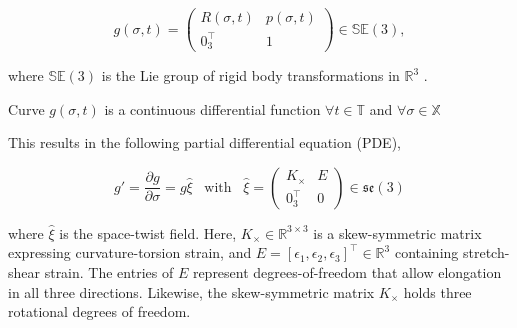\begin{equation}
    g(\sigma,t) = \begin{pmatrix}  R(\sigma,t) & p(\sigma,t) \\ 0_3^\top & 1 \end{pmatrix} \in \mathbb{SE}(3),
    \label{eq2:g}
\end{equation}

where $\mathbb{SE}(3)$ is the Lie group of rigid body transformations in $\mathbb{R}^3$ \cite{Sola2018}. 

\begin{theorem}
Curve  $g(\sigma,t)$ is a continuous differential function $ \forall t \in 
\mathbb{T} $ and $\forall \sigma \in \mathbb{X}$
\end{theorem}

 This results in the following partial differential equation (PDE), 




\begin{equation}
   g' = \frac{\partial g}{\partial \sigma} = g \hat{\xi} \hspace{10pt} \text{with} \hspace{10pt}  \hat{\xi} = \begin{pmatrix} K_\times & E \\ 0_3^\top & 0 \end{pmatrix} \in  \mathfrak{se}(3)
    \label{eq2:dgdsigma}
\end{equation}

where $\hat{\xi}$ is the space-twist field. Here, $K_\times \in \mathbb{R}^{3\times 3}$ is a skew-symmetric matrix expressing curvature-torsion strain, and $E = [\epsilon_1,\epsilon_2,\epsilon_3]^\top \in \mathbb{R}^3$ containing stretch-shear strain. The entries of $E$ represent degrees-of-freedom that allow elongation in all three directions. Likewise, the skew-symmetric matrix $K_{\times}$ holds three rotational degrees of freedom.  

